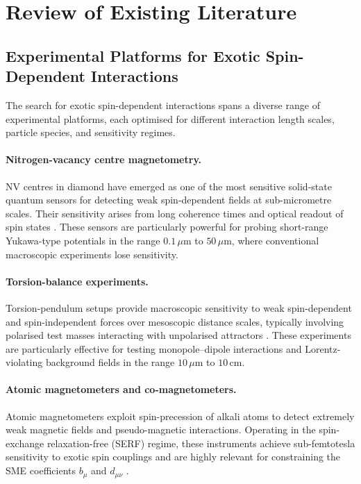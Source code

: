 \documentclass[12pt,a4paper]{report}
\begin{document}
\section{Review of Existing Literature}

\subsection{Experimental Platforms for Exotic Spin-Dependent Interactions}

The search for exotic spin-dependent interactions spans a diverse range of
experimental platforms, each optimised for different interaction length scales,
particle species, and sensitivity regimes.

\paragraph{Nitrogen-vacancy centre magnetometry.}
NV centres in diamond have emerged as one of the most sensitive solid-state
quantum sensors for detecting weak spin-dependent fields at sub-micrometre
scales. Their sensitivity arises from long coherence times and optical readout
of spin states \cite{Rong2018a,Rong2018b}. These sensors are particularly
powerful for probing short-range Yukawa-type potentials in the range
$0.1\,\mu\mathrm{m}$ to $50\,\mu\mathrm{m}$, where conventional macroscopic
experiments lose sensitivity.

\paragraph{Torsion-balance experiments.}
Torsion-pendulum setups provide macroscopic sensitivity to weak spin-dependent
and spin-independent forces over mesoscopic distance scales, typically involving
polarised test masses interacting with unpolarised attractors \cite{Heckel2008}.
These experiments are particularly effective for testing monopole--dipole
interactions and Lorentz-violating background fields in the range
$10\,\mu\mathrm{m}$ to $10\,\mathrm{cm}$.

\paragraph{Atomic magnetometers and co-magnetometers.}
Atomic magnetometers exploit spin-precession of alkali atoms to detect extremely
weak magnetic fields and pseudo-magnetic interactions. Operating in the
spin-exchange relaxation-free (SERF) regime, these instruments achieve
sub-femtotesla sensitivity to exotic spin couplings and are highly relevant for
constraining the SME coefficients $b_{\mu}$ and $d_{\mu\nu}$
\cite{Vasilakis2009}.
\end{document}
